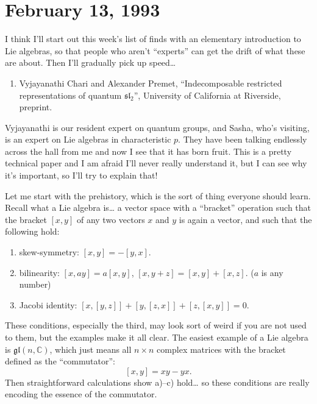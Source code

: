 \documentclass[12pt]{article}
\def\tightlist{}
\begin{document}
\hypertarget{week5}{%
\section{February 13, 1993}\label{week5}}

I think I'll start out this week's list of finds with an elementary
introduction to Lie algebras, so that people who aren't ``experts'' can
get the drift of what these are about. Then I'll gradually pick up
speed\ldots{}

\begin{enumerate}
\def\labelenumi{\arabic{enumi})}
\tightlist
\item
  Vyjayanathi Chari and Alexander Premet, ``Indecomposable restricted
  representations of quantum \(\mathfrak{sl}_2\)'', University of
  California at Riverside, preprint.
\end{enumerate}

Vyjayanathi is our resident expert on quantum groups, and Sasha, who's
visiting, is an expert on Lie algebras in characteristic \(p\). They
have been talking endlessly across the hall from me and now I see that
it has born fruit. This is a pretty technical paper and I am afraid I'll
never really understand it, but I can see why it's important, so I'll
try to explain that!

Let me start with the prehistory, which is the sort of thing everyone
should learn. Recall what a Lie algebra is\ldots{} a vector space with a
``bracket'' operation such that the bracket \([x,y]\) of any two vectors
\(x\) and \(y\) is again a vector, and such that the following hold:

\begin{enumerate}
\def\labelenumi{\alph{enumi})}
\tightlist
\item
  skew-symmetry: \([x,y] = -[y,x]\).
\item
  bilinearity: \([x,ay] = a[x,y]\), \([x,y+z] = [x,y] + [x,z]\). (\(a\)
  is any number)
\item
  Jacobi identity: \([x,[y,z]] + [y,[z,x]] + [z,[x,y]] = 0\).
\end{enumerate}

These conditions, especially the third, may look sort of weird if you
are not used to them, but the examples make it all clear. The easiest
example of a Lie algebra is \(\mathfrak{gl}(n,\mathbb{C})\), which just
means all \(n\times n\) complex matrices with the bracket defined as the
``commutator'': \[[x,y] = xy-yx.\] Then straightforward calculations
show a)--c) hold\ldots{} so these conditions are really encoding the
essence of the commutator.
\end{document}
